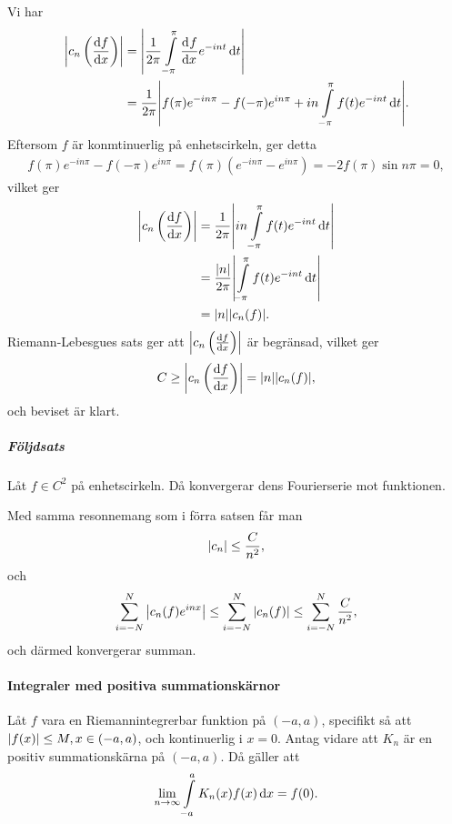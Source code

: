 \proof
Vi har
\begin{align*}
	\abs{c_{n}\left(\dv{f}{x}\right)} &= \abs{\frac{1}{2\pi}\int\limits_{-\pi}^{\pi}\dv[]{f}{x} (t)e^{-int}\dd{t}} \\
	                                  &= \frac{1}{2\pi}\abs{f(\pi)e^{-in\pi} - f(-\pi)e^{in\pi} + in\int\limits_{-\pi}^{\pi}f(t)e^{-int}\dd{t}}.
\end{align*}
Eftersom $f$ är konmtinuerlig på enhetscirkeln, ger detta
\begin{align*}
	f(\pi)e^{-in\pi} - f(-\pi)e^{in\pi} = f(\pi)(e^{-in\pi} - e^{in\pi}) = -2f(\pi)\sin{n\pi} = 0,
\end{align*}
vilket ger
\begin{align*}
	\abs{c_{n}\left(\dv{f}{x}\right)} &= \frac{1}{2\pi}\abs{in\int\limits_{-\pi}^{\pi}f(t)e^{-int}\dd{t}} \\
	                                  &= \frac{\abs{n}}{2\pi}\abs{\int\limits_{-\pi}^{\pi}f(t)e^{-int}\dd{t}} \\
	                                  &= \abs{n}\abs{c_{n}(f)}.
\end{align*}
Riemann-Lebesgues sats ger att $\abs{c_{n}\left(\dv{f}{x}\right)}$ är begränsad, vilket ger
\begin{align*}
	C \geq \abs{c_{n}\left(\dv{f}{x}\right)} = \abs{n}\abs{c_{n}(f)},
\end{align*}
och beviset är klart.

\subparagraph{Följdsats}
Låt $f\in C^{2}$ på enhetscirkeln. Då konvergerar dens Fourierserie mot funktionen.

\proof
Med samma resonnemang som i förra satsen får man
\begin{align*}
	\abs{c_{n}} \leq \frac{C}{n^{2}},
\end{align*}
och
\begin{align*}
	\sum\limits_{i = -N}^{N}\abs{c_{n}(f)e^{inx}} \leq \sum\limits_{i = -N}^{N}\abs{c_{n}(f)} \leq \sum\limits_{i = -N}^{N}\frac{C}{n^{2}},
\end{align*}
och därmed konvergerar summan.

\paragraph{Integraler med positiva summationskärnor}
Låt $f$ vara en Riemannintegrerbar funktion på $(-a, a)$, specifikt så att $\abs{f(x)}\leq M, x\in (-a, a)$, och kontinuerlig i $x = 0$. Antag vidare att $K_{n}$ är en positiv summationskärna på $(-a, a)$. Då gäller att
\begin{align*}
	\lim\limits_{n\to\infty}\int\limits_{-a}^{a}K_{n}(x)f(x)\dd{x} = f(0).
\end{align*}

